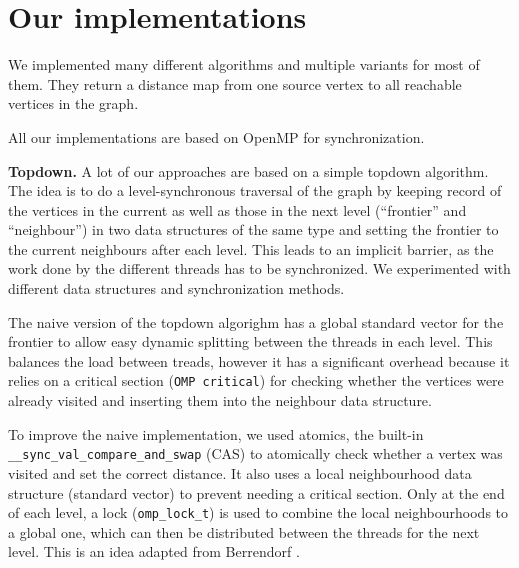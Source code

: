 \documentclass[letterpaper]{article}
\newcommand{\mypar}[1]{{\bf #1.}}
\begin{document}
\section{Our implementations}\label{sec:yourmethod}

%
%

We implemented many different algorithms and multiple variants for most of them. They return a distance map from one source vertex to all reachable vertices in the graph.

All our implementations are based on OpenMP for synchronization.


\mypar{Topdown}
A lot of our approaches are based on a simple topdown algorithm. The idea is to do a level-synchronous traversal of the graph by keeping record of the vertices in the current as well as those in the next level (``frontier'' and ``neighbour'') in two data structures of the same type and setting the frontier to the current neighbours after each level. This leads to an implicit barrier, as the work done by the different threads has to be synchronized. We experimented with different data structures and synchronization methods.

The naive version of the topdown algorighm has a global standard vector for the frontier to allow easy dynamic splitting between the threads in each level. This balances the load between treads, however it has a significant overhead because it relies on a critical section (\verb+OMP critical+) for checking whether the vertices were already visited and inserting them into the neighbour data structure.

To improve the naive implementation, we used atomics, the built-in \verb+__sync_val_compare_and_swap+ (CAS) to atomically check whether a vertex was visited and set the correct distance. It also uses a local neighbourhood data structure (standard vector) to prevent needing a critical section. Only at the end of each level, a lock (\verb+omp_lock_t+) is used to combine the local neighbourhoods to a global one, which can then be distributed between the threads for the next level. This is an idea adapted from Berrendorf \cite{Berrendorf:14}.
\end{document}
